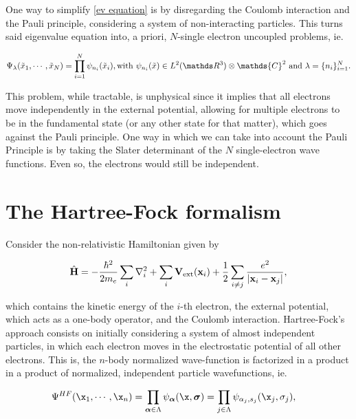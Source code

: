 \documentclass{homework}
\begin{document}
One way to simplify \eqref{ev equation} is by disregarding the Coulomb interaction and the Pauli principle, considering a system of non-interacting particles. This turns said eigenvalue equation into, a priori, $N$-single electron uncoupled problems, ie.

$$
\Psi_\lambda(\tilde{x}_1, \cdots, \tilde{x}_N) = \prod_{i=1}^{N} \psi_{n_i}(\tilde{x}_i), \textnormal{with } \psi_{n_i}(\tilde{x}) \in L^2(\R^{3}) \otimes \mathds{C}^2 \textnormal{ and } \lambda = \{n_i\}_{i=1}^{N}.
$$

This problem, while tractable, is unphysical since it implies that all electrons move independently in the external potential, allowing for multiple electrons to be in the fundamental state (or any other state for that matter), which goes against the Pauli principle. One way in which we can take into account the Pauli Principle is by taking the Slater determinant of the $N$ single-electron wave functions. Even so, the electrons would still be independent. \\

\section{The Hartree-Fock formalism}

Consider the non-relativistic Hamiltonian given by 

\begin{equation}
    \hat{\bf H} = -\frac{\hbar^2}{2m_e} \sum_i \nabla^2_i + \sum_{i} {\bf V}_{\textnormal{ext}} ({\bf x}_i) + \frac{1}{2} \sum_{i \neq j} \frac{e^2}{|{\bf x}_i-{\bf x}_j|},
\label{hamiltonian HF}
\end{equation}

which contains the kinetic energy of the $i$-th electron, the external potential, which acts as a one-body operator, and the Coulomb interaction. Hartree-Fock's approach consists on initially considering a system of almost independent particles, in which each electron moves in the electrostatic potential of all other electrons. This is, the $n$-body normalized wave-function is factorized in a product in a product of normalized, independent particle wavefunctions, ie.

\begin{align*}
     & \Psi^{HF} (\x_1, \cdots, \x_n) = \prod_{\bm{\alpha} \in \Lambda} \psi_{\bm{\alpha}}(\x, {\bm \sigma}) =  \prod_{j \in \Lambda}\psi_{\alpha_j, s_j}(\x_j, \sigma_j),
\end{align*}
\end{document}
